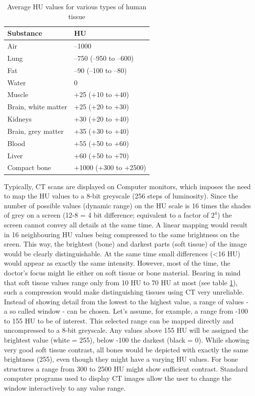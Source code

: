 \begin{table}[]
	\centering
	\caption{Average HU values for various types of human tissue}
	\label{tab:HU}
	\begin{tabular}{@{}ll@{}}
		\toprule
		Substance           & HU                     \\ \midrule
		Air                 & –1000                  \\
		Lung                & –750 (–950 to –600)    \\
		Fat                 & –90 (–100 to –80)      \\
		Water               & 0                      \\
		Muscle              & +25 (+10 to +40)       \\
		Brain, white matter & +25 (+20 to +30)       \\
		Kidneys             & +30 (+20 to +40)       \\
		Brain, grey matter  & +35 (+30 to +40)       \\
		Blood               & +55 (+50 to +60)       \\
		Liver               & +60 (+50 to +70)       \\
		Compact bone        & +1000 (+300 to +2500)  \\ \bottomrule
	\end{tabular}
\end{table}

Typically, CT scans are displayed on Computer monitors, which imposes the need to map the HU values to a 8-bit greyscale (256 steps of luminosity).
Since the number of possible values (dynamic range) on the HU scale is 16 times the shades of grey on a screen (12-8 = 4 bit difference; equivalent to a factor of $2^4$) the screen cannot convey all details at the same time.
A linear mapping would result in 16 neighbouring HU values being compressed to the same brightness on the sreen.
This way, the brightest (bone) and darkest parts (soft tissue) of the image would be clearly distinguishable.
At the same time small differences (<16 HU) would appear as exactly the same intensity.
However, most of the time, the doctor's focus might lie either on soft tissue or bone material.
Bearing in mind that soft tissue values range only from 10 HU to 70 HU at most (see table \ref{tab:HU}), such a compression would make distinguishing tissues using CT very unreliable.
Instead of showing detail from the lowest to the highest value, a range of values - a so called window - can be chosen.
Let's assume, for example, a range from -100 to 155 HU to be of interest.
This selected range can be mapped directly and uncompressed to a 8-bit greyscale.
Any values above 155 HU will be assigned the brightest value (white = 255), below -100 the darkest (black = 0).
While showing very good soft tissue contrast, all bones would be depicted with exactly the same brightness (255), even though they might have a varying HU values.
For bone structures a range from 300 to 2500 HU might show sufficient contrast.
Standard computer programs used to display CT images allow the user to change the window interactively to any value range. \cite{Podgorsak, Maidment2014}

